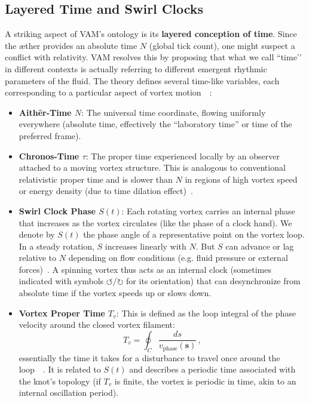 \documentclass[a4paper,12pt]{article}
\begin{document}
    \subsection{Layered Time and Swirl Clocks}
    A striking aspect of VAM’s ontology is its \textbf{layered conception of time}. Since the æther provides an absolute time $N$ (global tick count), one might suspect a conflict with relativity. VAM resolves this by proposing that what we call ``time’’ in different contexts is actually referring to different emergent rhythmic parameters of the fluid. The theory defines several time-like variables, each corresponding to a particular aspect of vortex motion~\cite{reference_42}~\cite{reference_43}:
    \begin{itemize}
        \item \textbf{Aithēr-Time $N$}: The universal time coordinate, flowing uniformly everywhere (absolute time, effectively the “laboratory time” or time of the preferred frame).
        \item \textbf{Chronos-Time $\tau$}: The proper time experienced locally by an observer attached to a moving vortex structure. This is analogous to conventional relativistic proper time and is slower than $N$ in regions of high vortex speed or energy density (due to time dilation effect)~\cite{reference_44}.
        \item \textbf{Swirl Clock Phase $S(t)$}: Each rotating vortex carries an internal phase that increases as the vortex circulates (like the phase of a clock hand). We denote by $S(t)$ the phase angle of a representative point on the vortex loop. In a steady rotation, $S$ increases linearly with $N$. But $S$ can advance or lag relative to $N$ depending on flow conditions (e.g. fluid pressure or external forces)~\cite{reference_45}. A spinning vortex thus acts as an internal clock (sometimes indicated with symbols $\circlearrowleft/\circlearrowright$ for its orientation) that can desynchronize from absolute time if the vortex speeds up or slows down.
        \item \textbf{Vortex Proper Time $T_v$}: This is defined as the loop integral of the phase velocity around the closed vortex filament:
        \begin{equation}
            T_v = \oint_C \frac{ds}{v_{\text{phase}}(\mathbf{s})}\,,
        \end{equation}
        essentially the time it takes for a disturbance to travel once around the loop~\cite{reference_46}~\cite{reference_47}. It is related to $S(t)$ and describes a periodic time associated with the knot’s topology (if $T_v$ is finite, the vortex is periodic in time, akin to an internal oscillation period).

\end{itemize}
\end{document}
